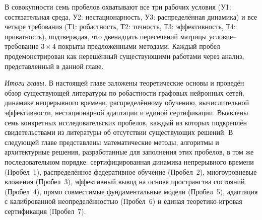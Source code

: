 В совокупности семь пробелов охватывают все три рабочих условия (У1: состязательная среда, У2: нестационарность, У3: распределённая динамика) и все четыре требования (Т1: робастность, Т2: точность, Т3: эффективность, Т4: приватность), подтверждая, что двенадцать пересечений матрицы условие--требование $3\times4$ покрыты предложенными методами. Каждый пробел продемонстрирован как нерешённый существующими работами через анализ, представленный в данной главе.

\medskip
\noindent\textit{Итоги главы.} В настоящей главе заложены теоретические основы и проведён обзор существующей литературы по робастности графовых нейронных сетей, динамике непрерывного времени, распределённому обучению, вычислительной эффективности, нестационарной адаптации и единой сертификации. Выявлены семь конкретных исследовательских пробелов, каждый из которых подкреплён свидетельствами из литературы об отсутствии существующих решений. В следующей главе представлены математические методы, алгоритмы и архитектурные решения, разработанные для заполнения этих пробелов, в том же последовательном порядке: сертифицированная динамика непрерывного времени (Пробел~1), распределённое федеративное обучение (Пробел~2), многоуровневые вложения (Пробел~3), эффективный вывод на основе пространства состояний (Пробел~4), прямо совместимые фундаментальные модели (Пробел~5), адаптация с калиброванной неопределённостью (Пробел~6) и единая теоретико-игровая сертификация (Пробел~7).


